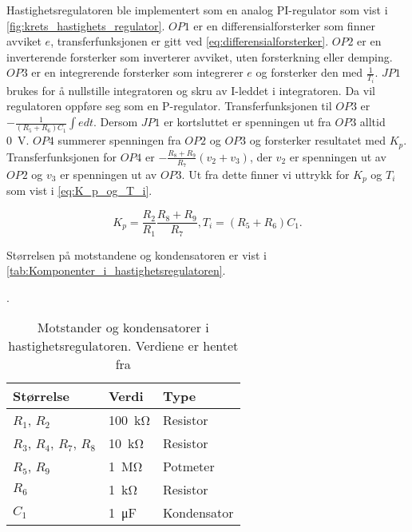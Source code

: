 Hastighetsregulatoren ble implementert som en analog PI-regulator som vist i \autoref{fig:krets_hastighets_regulator}. $OP1$ er en differensialforsterker som finner avviket $e$, transferfunksjonen er gitt ved \autoref{eq:differensialforsterker}.
$OP2$ er en inverterende forsterker som inverterer avviket, uten forsterkning eller demping.
$OP3$ er en integrerende forsterker som integrerer $e$ og forsterker den med $\frac{1}{T_i}$. $JP1$ brukes for å nullstille integratoren og skru av I-leddet i integratoren. Da vil regulatoren oppføre seg som en P-regulator. Transferfunksjonen til $OP3$ er $-\frac{1}{(R_5 + R_6) C_1} \int e dt$. Dersom $JP1$ er kortsluttet er spenningen ut fra $OP3$ alltid {\SI{0}{\volt}}.
$OP4$ summerer spenningen fra $OP2$ og $OP3$ og forsterker resultatet med $K_p$. Transferfunksjonen for $OP4$ er $-\frac{R_8 + R_9}{R_7}(v_2 + v_3)$, der $v_2$ er spenningen ut av $OP2$ og $v_3$ er spenningen ut av $OP3$. Ut fra dette finner vi uttrykk for $K_p$ og $T_i$ som vist i \autoref{eq:K_p_og_T_i}.

\begin{equation}
    \label{eq:K_p_og_T_i}
    K_p = \frac{R_2}{R_1} \frac{R_8 + R_9}{R_7}, 
    T_i = (R_5 + R_6) C_1.
\end{equation}

Størrelsen på motstandene og kondensatoren er vist i \autoref{tab:Komponenter_i_hastighetsregulatoren}.

\begin{table}[h]
    \centering
    \caption{Motstander og kondensatorer i hastighetsregulatoren. Verdiene er hentet fra \cite{AnalogMotorlabbOppgaver}}.
    \begin{tabular}{lll}
        \toprule
        Størrelse & Verdi & Type \\
		\midrule
        $R_1$, $R_2$ & \SI{100}{\kilo\ohm} & Resistor\\
        $R_3$, $R_4$, $R_7$, $R_8$ & \SI{10}{\kilo\ohm} & Resistor \\
        $R_5$, $R_9$ & \SI{1}{\mega\ohm} & Potmeter \\
        $R_6$ & \SI{1}{\kilo\ohm} & Resistor \\
        $C_1$ & \SI{1}{\micro\farad} & Kondensator \\
        \bottomrule
    \end{tabular}
    \label{tab:Komponenter_i_hastighetsregulatoren}
\end{table}






